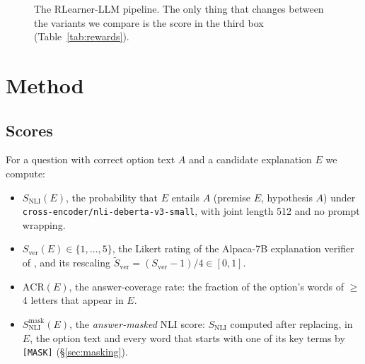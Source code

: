 \begin{figure}[t]
\centering
{}
\caption{The RLearner-LLM pipeline. The only thing that changes between the variants we compare is the score in the third box (Table~\ref{tab:rewards}).}
\label{fig:hybrid_dpo}
\end{figure}

\section{Method}
\label{sec:methodology}

\subsection{Scores}
\label{sec:first_principles}
For a question with correct option text $A$ and a candidate explanation $E$ we compute:
\begin{itemize}
\item $S_\text{NLI}(E)$, the probability that $E$ entails $A$ (premise $E$, hypothesis $A$) under \texttt{cross-encoder/nli-deberta-v3-small}, with joint length 512 and no prompt wrapping.
\item $S_\text{ver}(E)\in\{1,\dots,5\}$, the Likert rating of the Alpaca-7B explanation verifier of \citet{bao2025exploring}, and its rescaling $\tilde S_\text{ver}=(S_\text{ver}-1)/4\in[0,1]$.
\item $\mathrm{ACR}(E)$, the answer-coverage rate: the fraction of the option's words of $\geq$4 letters that appear in $E$.
\item $S_\text{NLI}^\text{mask}(E)$, the \emph{answer-masked} NLI score: $S_\text{NLI}$ computed after replacing, in $E$, the option text and every word that starts with one of its key terms by \texttt{[MASK]} (\S\ref{sec:masking}).
\end{itemize}

